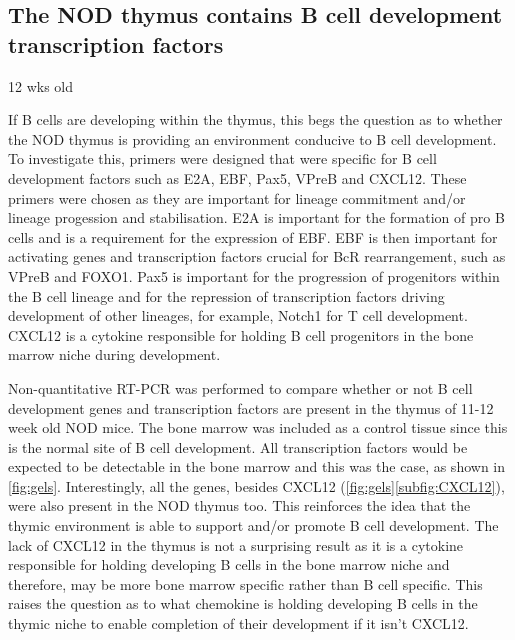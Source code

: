 \subsection{The NOD thymus contains B cell development transcription factors}
\label{subsec:TFs}

12 wks old

If B cells are developing within the thymus, this begs the question as to whether the NOD thymus is providing an environment conducive to B cell development. 
To investigate this, primers were designed that were specific for B cell development factors such as E2A, EBF, Pax5, VPreB and CXCL12.
These primers were chosen as they are important for lineage commitment and/or lineage progession and stabilisation.
E2A is important for the formation of pro B cells and is a requirement for the expression of EBF.
EBF is then important for activating genes and transcription factors crucial for BcR rearrangement, such as VPreB and FOXO1.
Pax5 is important for the progression of progenitors within the B cell lineage and for the repression of transcription factors driving development of other lineages, for example, Notch1 for T cell development.
CXCL12 is a cytokine responsible for holding B cell progenitors in the bone marrow niche during development.

Non-quantitative RT-PCR was performed to compare whether or not B cell development genes and transcription factors are present in the thymus of 11-12 week old NOD mice.
The bone marrow was included as a control tissue since this is the normal site of B cell development.
All transcription factors would be expected to be detectable in the bone marrow and this was the case, as shown in \cref{fig:gels}.
Interestingly, all the genes, besides CXCL12 (\cref{fig:gels}\ref{subfig:CXCL12}), were also present in the NOD thymus too.
This reinforces the idea that the thymic environment is able to support and/or promote B cell development.
The lack of CXCL12 in the thymus is not a surprising result as it is a cytokine responsible for holding developing B cells in the bone marrow niche and therefore, may be more bone marrow specific rather than B cell specific.
This raises the question as to what chemokine is holding developing B cells in the thymic niche to enable completion of their development if it isn't CXCL12.

